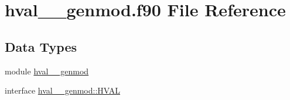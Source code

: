 \hypertarget{hval____genmod_8f90}{\section{hval\+\_\+\+\_\+genmod.\+f90 File Reference}
\label{hval____genmod_8f90}
}
\subsection*{Data Types}
\begin{DoxyCompactItemize}
\item 
module \hyperlink{classhval____genmod}{hval\+\_\+\+\_\+genmod}
\item 
interface \hyperlink{interfacehval____genmod_1_1HVAL}{hval\+\_\+\+\_\+genmod\+::\+H\+V\+A\+L}
\end{DoxyCompactItemize}
